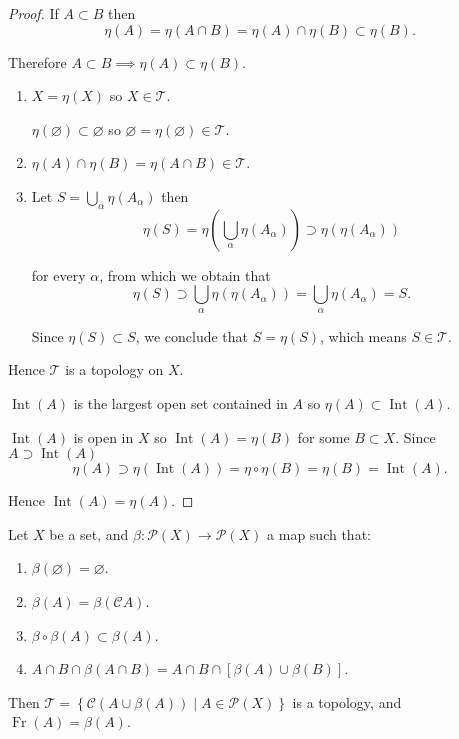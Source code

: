 \begin{proof}
	If \( A \subset B \) then
	\[
		\eta(A) = \eta(A \cap B) = \eta(A) \cap \eta(B) \subset \eta(B).
	\]

	Therefore \( A \subset B \implies \eta(A) \subset \eta(B) \).
	\begin{enumerate}[label={(\roman*)}]
		\item \( X = \eta(X) \) so \( X \in \mathscr{T} \).

		      \( \eta(\varnothing) \subset \varnothing \) so \( \varnothing = \eta(\varnothing) \in \mathscr{T} \).
		\item \( \eta(A) \cap \eta(B) = \eta(A \cap B) \in \mathscr{T} \).
		\item Let \( S = \bigcup_{\alpha} \eta(A_{\alpha}) \) then
		      \[
			      \eta(S) = \eta\left( \bigcup_{\alpha} \eta(A_{\alpha}) \right) \supset \eta(\eta(A_{\alpha}))
		      \]

		      for every \(\alpha\), from which we obtain that
		      \[
			      \eta(S) \supset \bigcup_{\alpha}\eta(\eta(A_{\alpha})) = \bigcup_{\alpha} \eta(A_{\alpha}) = S.
		      \]

		      Since \( \eta(S) \subset S \), we conclude that \( S = \eta(S) \), which means \( S \in \mathscr{T} \).
	\end{enumerate}

	Hence \( \mathscr{T} \) is a topology on \(X\).

	\( \operatorname{Int}(A) \) is the largest open set contained in \( A \) so \( \eta(A) \subset \operatorname{Int}(A) \).

	\( \operatorname{Int}(A) \) is open in \(X\) so \( \operatorname{Int}(A) = \eta(B) \) for some \( B \subset X \). Since \( A \supset \operatorname{Int}(A) \)
	\[
		\eta(A) \supset \eta(\operatorname{Int}(A)) = \eta\circ\eta(B) = \eta(B) = \operatorname{Int}(A).
	\]

	Hence \( \operatorname{Int}(A) = \eta(A) \).
\end{proof}

\begin{proposition}{5.4}
	Let \(X\) be a set, and \( \beta: \mathscr{P}(X) \to \mathscr{P}(X) \) a map such that:
	\begin{enumerate}[label={(\arabic*)}]
		\item \( \beta(\varnothing) = \varnothing \).
		\item \( \beta(A) = \beta(\mathscr{C}A) \).
		\item \( \beta \circ \beta(A) \subset \beta(A) \).
		\item \( A \cap B \cap \beta(A \cap B) = A \cap B \cap \left[\beta(A) \cup \beta(B)\right] \).
	\end{enumerate}

	Then \( \mathscr{T} = \left\{ \mathscr{C}(A \cup \beta(A)) \mid A \in \mathscr{P}(X) \right\} \) is a topology, and \( \operatorname{Fr}(A) = \beta(A) \).
\end{proposition}

